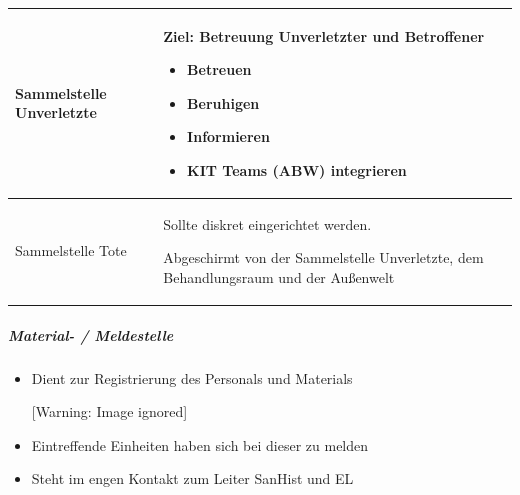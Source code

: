 \documentclass{article}
\begin{document}
\begin{center}
\tablehead{}\begin{supertabular}{|m{4.367cm}m{4.367cm}m{4.367cm}|}
\hline
Sammelstelle Unverletzte

 \par

 &
Ziel: Betreuung Unverletzter und Betroffener

\begin{itemize}
\item Betreuen

\item Beruhigen

\item Informieren

\item KIT Teams (ABW) integrieren

\end{itemize}
 &
 \par

\\\hline
Sammelstelle Tote

 &
Sollte diskret eingerichtet werden.

Abgeschirmt von der Sammel\-stelle Unverletzte, dem Be\-handlungs\-raum
und der Au{\ss}en\-welt

 &
 \par

\\\hline
\end{supertabular}
\end{center}
\subparagraph{Material- / Meldestelle}
\begin{itemize}
\item Dient zur Registrierung des Personals und Materials

\begin{center}
 [Warning: Image ignored] %

\end{center}
\item Eintreffende Einheiten haben sich bei dieser zu melden

\item Steht im engen Kontakt zum Leiter SanHist und EL  

\end{itemize}
\end{document}

